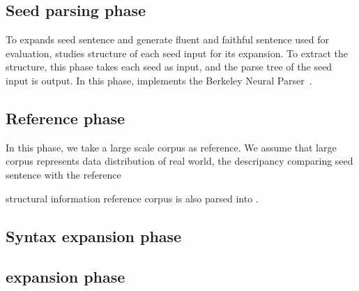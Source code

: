 \subsection{Seed parsing phase}
To expands seed sentence and generate fluent and faithful sentence
used for evaluation, \Model studies structure of each seed input for
its expansion. To extract the structure, this phase takes each seed as
input, and the parse tree of the seed input is output.  In this phase,
\Model implements the Berkeley Neural
Parser~\cite{kitaev2018seedparser,kitaev2019seedparser}.

\subsection{Reference phase}
In this phase, we take a large scale corpus as reference. We assume
that large corpus represents data distribution of real world,
the descripancy comparing seed sentence with the reference 


structural information reference corpus is also parsed into \cfg.


\subsection{Syntax expansion phase}

\subsection{\Sent expansion phase}
